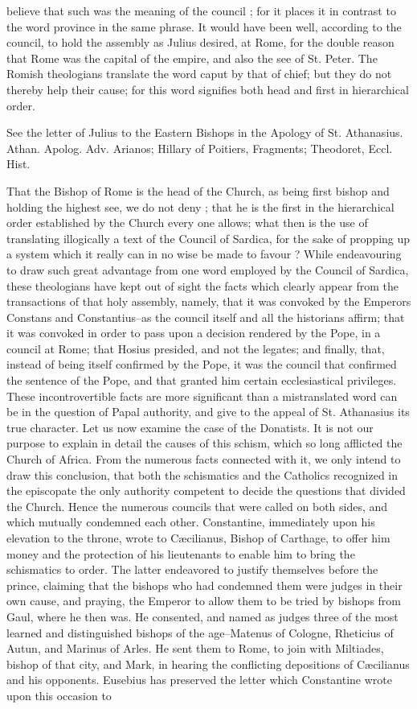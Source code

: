 believe that such was the meaning of the council ; for it places it in contrast to the word province in the same phrase. It would have been well, according to the council, to hold the assembly as Julius desired, at Rome, for the double reason that Rome was the capital of the empire, and also the see of St. Peter. The Romish theologians translate the word caput by that of chief; but they do not thereby help their cause; for this word signifies both head and first in hierarchical order.

See the letter of Julius to the Eastern Bishops in the Apology of St. Athanasius. Athan. Apolog. Adv. Arianos; Hillary of Poitiers, Fragments; Theodoret, Eccl. Hist.

That the Bishop of Rome is the head of the Church, as being first bishop and holding the highest see, we do not deny ; that he is the first in the hierarchical order established by the Church every one allows; what then is the use of translating illogically a text of the Council of Sardica, for the sake of propping up a system which it really can in no wise be made to favour ? While endeavouring to draw such great advantage from one word employed by the Council of Sardica, these theologians have kept out of sight the facts which clearly appear from the transactions of that holy assembly, namely, that it was convoked by the Emperors Constans and Constantius--as the council itself and all the historians affirm; that it was convoked in order to pass upon a decision rendered by the Pope, in a council at Rome; that Hosius presided, and not the legates; and finally, that, instead of being itself confirmed by the Pope, it was the council that confirmed the sentence of the Pope, and that granted him certain ecclesiastical privileges. These incontrovertible facts are more significant than a mistranslated word can be in the question of Papal authority, and give to the appeal of St. Athanasius its true character. Let us now examine the case of the Donatists. It is not our purpose to explain in detail the causes of this schism, which so long afflicted the Church of Africa. From the numerous facts connected with it, we only intend to draw this conclusion, that both the schismatics and the Catholics recognized in the episcopate the only authority competent to decide the questions that divided the Church. Hence the numerous councils that were called on both sides, and which mutually condemned each other. Constantine, immediately upon his elevation to the throne, wrote to Cæcilianus, Bishop of Carthage, to offer him money and the protection of his lieutenants to enable him to bring the schismatics to order. The latter endeavored to justify themselves before the prince, claiming that the bishops who had condemned them were judges in their own cause, and praying, the Emperor to allow them to be tried by bishops from Gaul, where he then was. He consented, and named as judges three of the most learned and distinguished bishops of the age--Matenus of Cologne, Rheticius of Autun, and Marinus of Arles. He sent them to Rome, to join with Miltiades, bishop of that city, and Mark, in hearing the conflicting depositions of Cæcilianus and his opponents. Eusebius has preserved the letter which Constantine wrote upon this occasion to 